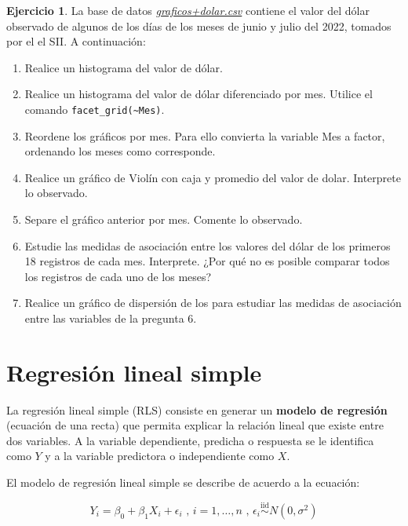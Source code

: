 \documentclass[
  11pt,
]{book}
\providecommand{\tightlist}{%
  \setlength{\itemsep}{0pt}\setlength{\parskip}{0pt}}
\theoremstyle{definition}
\theoremstyle{definition}
\theoremstyle{definition}
\newtheorem{exercise}{Ejercicio}[chapter]
\theoremstyle{definition}
\theoremstyle{remark}
\begin{document}
\begin{exercise}

La base de datos \href{https://raw.githubusercontent.com/Dfranzani/Bases-de-datos-para-cursos/main/2022-2/Estad\%C3\%ADstica\%202/dolar.csv}{\emph{graficos+dolar.csv}} contiene el valor del dólar observado de algunos de los días de los meses de junio y julio del 2022, tomados por el el SII. A continuación:

\begin{enumerate}
\def\labelenumi{\arabic{enumi}.}
\tightlist
\item
  Realice un histograma del valor de dólar.
\item
  Realice un histograma del valor de dólar diferenciado por mes. Utilice el comando \texttt{facet\_grid(\textasciitilde{}Mes)}.
\item
  Reordene los gráficos por mes. Para ello convierta la variable Mes a factor, ordenando los meses como corresponde.
\item
  Realice un gráfico de Violín con caja y promedio del valor de dolar. Interprete lo observado.
\item
  Separe el gráfico anterior por mes. Comente lo observado.
\item
  Estudie las medidas de asociación entre los valores del dólar de los primeros 18 registros de cada mes. Interprete. ¿Por qué no es posible comparar todos los registros de cada uno de los meses?
\item
  Realice un gráfico de dispersión de los para estudiar las medidas de asociación entre las variables de la pregunta 6.
\end{enumerate}

\end{exercise}

\section{Regresión lineal simple}\label{regresiuxf3n-lineal-simple}

La regresión lineal simple (RLS) consiste en generar un \textbf{modelo de regresión} (ecuación de una recta) que permita explicar la relación lineal que existe entre dos variables. A la variable dependiente, predicha o respuesta se le identifica como \(Y\) y a la variable predictora o independiente como \(X\). \citep[página 450]{Devore}

El modelo de regresión lineal simple se describe de acuerdo a la ecuación:

\begin{equation}
Y_i = \beta_0 + \beta_1X_i + \epsilon_i \text{ , }i = 1,\ldots ,n \text{ , } \epsilon_i \overset{\text{iid}}{\sim} N(0,\sigma^2)
\label{eq:regresion}
\end{equation}
\end{document}
